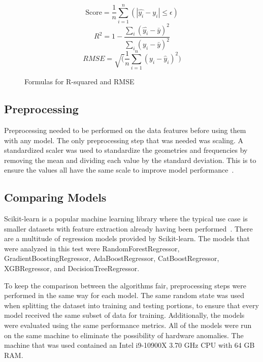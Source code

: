 \documentclass[conference]{IEEEtran}
\begin{document}
\begin{figure}[h]
    \begin{equation}
        \text{Score} = \frac{1}{n} \sum_{i=1}^{n}(\left|\hat{y_i} - y_i\right| \leq \epsilon)
        \label{eq:tolerance}
    \end{equation}
    \begin{equation}
        R^2 = 1 - \frac{\sum_{i}(\hat{y_i} - \bar{y})^2}{\sum_{i}(y_i - \bar{y})^2}
        \label{eq:rsquared}
    \end{equation}
    \begin{equation}
        {RMSE} = \sqrt(\frac{1}{n} \sum_{i=1}^{n}(y_i - \hat{y}_i)^2)
        \label{eq:rmse}
    \end{equation}
    \caption{Formulas for R-squared and RMSE}
\end{figure}


\subsection{Preprocessing}
Preprocessing needed to be performed on the data features before using them with any model. The only preprocessing step that was needed was scaling. A standardized scaler was used to standardize the geometries and frequencies by removing the mean and dividing each value by the standard deviation. This is to ensure the values all have the same scale to improve model performance~\cite{9119820}. 


\subsection{Comparing Models}
Scikit-learn is a popular machine learning library where the typical use case is smaller datasets with feature extraction already having been performed~\cite{scikit-learn}. There are a multitude of regression models provided by Scikit-learn. The models that were analyzed in this test were RandomForestRegressor, GradientBoostingRegressor, AdaBoostRegressor, CatBoostRegressor, XGBRegressor, and DecisionTreeRegressor.

To keep the comparison between the algorithms fair, preprocessing steps were performed in the same way for each model. The same random state was used when splitting the dataset into training and testing portions, to ensure that every model received the same subset of data for training. Additionally, the models were evaluated using the same performance metrics. All of the models were run on the same machine to eliminate the possibility of hardware anomalies. The machine that was used contained an Intel i9-10900X 3.70 GHz CPU with 64 GB RAM.
\end{document}
